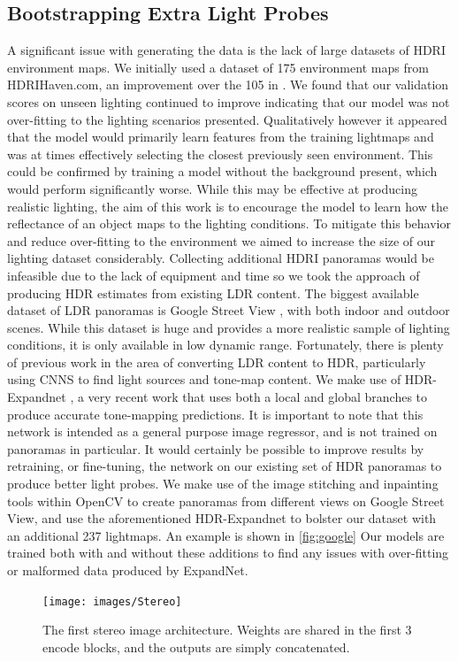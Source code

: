 \documentclass[ %
                    author={Gavin Parker},
                supervisor={Dr. Neill Campbell},
                    degree={MEng},
                     title={Deep Learning for Illumination Estimation from Stereo Images},
                  subtitle={},
                      type={Research},
                      year={2018} ]{dissertation}
\begin{document}
\subsection{Bootstrapping Extra Light Probes}
A significant issue with generating the data is the lack of large datasets of HDRI environment maps. We initially used a dataset of 175 environment maps from HDRIHaven.com, an improvement over the 105 in \cite{RematasCVPR2016}. We found that our validation scores on unseen lighting continued to improve indicating that our model was not over-fitting to the lighting scenarios presented. Qualitatively however it appeared that the model would primarily learn features from the training lightmaps and was at times effectively selecting the closest previously seen environment. This could be confirmed by training a model without the background present, which would perform significantly worse. While this may be effective at producing realistic lighting, the aim of this work is to encourage the model to learn how the reflectance of an object maps to the lighting conditions. To mitigate this behavior and reduce over-fitting to the environment we aimed to increase the size of our lighting dataset considerably. 
\newline
Collecting additional HDRI panoramas would be infeasible due to the lack of equipment and time so we took the approach of producing HDR estimates from existing LDR content. The biggest available dataset of LDR panoramas is Google Street View \cite{GoogleMaps}, with both indoor and outdoor scenes. While this dataset is huge and provides a more realistic sample of lighting conditions, it is only available in low dynamic range. Fortunately, there is plenty of previous work in the area of converting LDR content to HDR, particularly using CNNS to find light sources and tone-map content. We make use of HDR-Expandnet \cite{2018arXiv180302266M}, a very recent work that uses both a local and global branches to produce accurate tone-mapping predictions. It is important to note that this network is intended as a general purpose image regressor, and is not trained on panoramas in particular. It would certainly be possible to improve results by retraining, or fine-tuning, the network on our existing set of HDR panoramas to produce better light probes. We make use of the image stitching and inpainting tools within OpenCV to create panoramas from different views on Google Street View, and use the aforementioned HDR-Expandnet to bolster our dataset with an additional 237 lightmaps. An example is shown in \ref{fig:google} Our models are trained both with and without these additions to find any issues with over-fitting or malformed data produced by ExpandNet.
\begin{figure}[H]
\centering
\texttt{[image: images/Stereo]}
\caption 
\newline
The first stereo image architecture. Weights are shared in the first 3 encode blocks, and the outputs are simply concatenated.
\label{fig:basic}
\end{figure}
\end{document}
